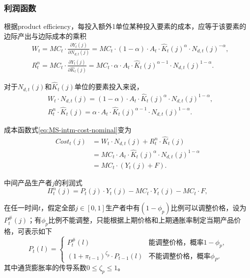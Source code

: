 \subsubsection{利润函数}
根据product efficiency，每投入额外1单位某种投入要素的成本，应等于该要素的边际产出与边际成本的乘积
\begin{align*}
&W_t = MC_t \cdot \frac{\partial Y_t(j)}{\partial N_{d,t}(j)} = MC_t \cdot (1-\alpha) \cdot A_t \cdot \hat{K}_t(j)^{\alpha} \cdot N_{d,t}(j)^{-\alpha}, \\
&R^n_t = MC_t \cdot \frac{\partial Y_t(j)}{\partial \hat{K}_t(j)} = MC_t \cdot \alpha \cdot A_t \cdot \hat{K}_t(j)^{\alpha - 1} \cdot N_{d,t}(j)^{1 -\alpha}.
\end{align*}

对于$N_{d,t}(j)$和$\hat{K}_t(j)$单位的要素投入来说，
\begin{align*}
&W_t \cdot N_{d,t}(j) = (1-\alpha) \cdot A_t \cdot \hat{K}_t(j)^{\alpha} \cdot N_{d,t}(j)^{1-\alpha}, \\
&R^n_t \cdot \hat{K}_{t}(j) = \alpha \cdot A_t \cdot \hat{K}_t(j)^{\alpha - 1} \cdot N_{d,t}(j)^{1 -\alpha}.
\end{align*}

成本函数式\eqref{eq:MS-intm-cost-nominal}变为
\begin{align*}
Cost_t(j) &= W_t \cdot N_{d,t}(j) + R^n_t \cdot \hat{K}_t(j) \\
&= MC_t \cdot A_t \cdot \hat{K}_t(j)^{\alpha} \cdot N_{d,t}(j)^{1-\alpha} \\
&=MC_t \cdot \left(Y_t(j) + F \right).
\end{align*}

中间产品生产者$j$的利润式
\begin{equation}
\label{eq:MS-intm-profit-eq}
\Pi^n_t(j)= P_t(j) \cdot Y_t(j) - MC_t \cdot Y_t(j) - MC_t \cdot F,
\end{equation}



在任一时间$t$，假定全部$j \in [0,1]$生产者中有$(1-\phi_p)$比例可以调整价格，设为$P_t^{\#}(j)$；有$\phi_p$比例不能调整，只能根据上期价格和上期通胀率制定当期产品价格，可表示如下
\begin{equation}
\label{eq:MS-price-setting-guide}
P_t(l) =
\begin{cases}
P_t^{\#}(l) & \mbox{能调整价格，概率$1-\phi_p$,} \\
\left(1+\pi_{t-1}\right)^{\zeta_p} \cdot P_{t-1}(l) &\mbox{不能调整价格，概率$\phi_P$.}
\end{cases}
\end{equation}
其中通货膨胀率的传导系数$0 \le \zeta_p \le 1$。

